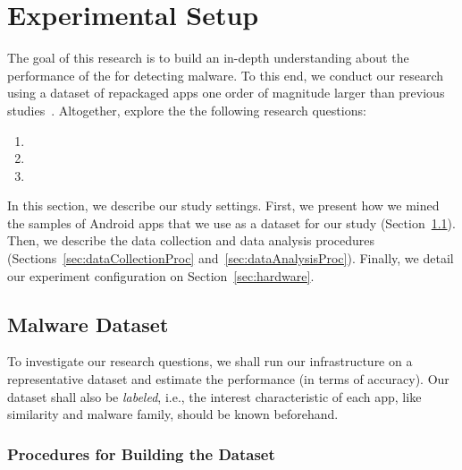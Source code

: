 \section{Experimental Setup}\label{sec:experimentalSetup}

The goal of this research is to build an in-depth understanding about
the performance of the \mas for detecting malware. To this
end, we conduct our research using a dataset of repackaged apps one order of magnitude
larger than previous studies~\cite{DBLP:conf/wcre/BaoLL18,DBLP:journals/jss/CostaMMSSBNR22}. Altogether,
explore the the following research questions:

\begin{enumerate}[(RQ1)]
\item \rqa
\item \rqc
\item \rqd  
\end{enumerate}

In this section, we describe our study settings. First, we present how we mined the samples of Android apps that we
use as a dataset for our study (Section~\ref{sec:dataset}).  Then, we describe the data
collection and data analysis procedures (Sections~\ref{sec:dataCollectionProc} and~\ref{sec:dataAnalysisProc}). Finally,
we detail our experiment configuration on Section~\ref{sec:hardware}. 


\subsection{Malware Dataset}\label{sec:dataset}


To investigate our research questions, we shall run our infrastructure on a representative dataset and
estimate the \mas performance (in terms of accuracy). Our dataset shall also
be \textit{labeled}, i.e., the interest characteristic of each app, like similarity and malware family, should be known beforehand. 

\subsubsection{Procedures for Building the Dataset}


